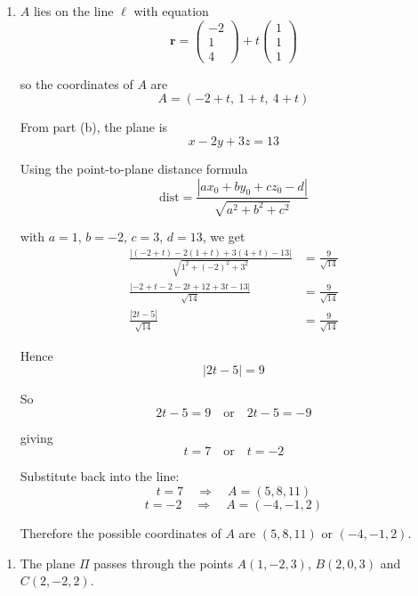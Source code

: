\documentclass[leqno]{article}
\begin{document}
\begin{enumerate}[
  label=\textbf{\arabic*.},
  leftmargin=*,
  topsep=0pt,
  partopsep=0pt,
  parsep=0pt
]
\begin{djsSolution}
\begin{enumerate}[label=\textbf{(\alph*)}]
  Therefore a Cartesian equation of \(\Pi\) is
  \[
  x-2y+3z=13
  \]

  \item \(A\) lies on the line \(\ell\) with equation
  \[
  \mathbf r=\begin{pmatrix}-2\\1\\4\end{pmatrix}+t\begin{pmatrix}1\\1\\1\end{pmatrix}
  \]

  so the coordinates of \(A\) are
  \[
  A=(-2+t,\ 1+t,\ 4+t)
  \]
  
  From part (b), the plane is
  \[
  x-2y+3z=13
  \]
  
  Using the point-to-plane distance formula
  \[
  \mathrm{dist}
  =\frac{\left\lvert ax_0+by_0+cz_0-d\right\rvert}{\sqrt{a^2+b^2+c^2}}
  \]

  with \(a=1\), \(b=-2\), \(c=3\), \(d=13\), we get
  \begin{align*}
  \frac{\left\lvert (-2+t)-2(1+t)+3(4+t)-13\right\rvert}{\sqrt{1^2+(-2)^2+3^2}} &= \frac{9}{\sqrt{14}}\\
  \frac{\left\lvert -2+t-2-2t+12+3t-13\right\rvert}{\sqrt{14}} &= \frac{9}{\sqrt{14}}\\
  \frac{\left\lvert 2t-5\right\rvert}{\sqrt{14}} &= \frac{9}{\sqrt{14}}
  \end{align*}
  
  Hence
  \[
  |2t-5|=9
  \]
  
  So
  \[
  2t-5=9 \quad \text{or} \quad 2t-5=-9
  \]
  
  giving
  \[
  t=7 \quad \text{or} \quad t=-2
  \]
  
  Substitute back into the line:
  \[
  t=7\quad\Longrightarrow\quad A=(5,8,11)
  \]
  \[
  t=-2\quad\Longrightarrow\quad A=(-4,-1,2)
  \]
  
  Therefore the possible coordinates of \(A\) are \((5,8,11)\) or \((-4,-1,2)\).
\end{enumerate}
\end{djsSolution}


\newpage

\questionitem

\begin{enumerate}[label=\textbf{(\alph*)}]
  \item The plane $\Pi$ passes through the points $A(1,-2,3)$, $B(2,0,3)$ and $C(2,-2,2)$.\\
  

\end{enumerate}
\end{enumerate}
\end{document}
